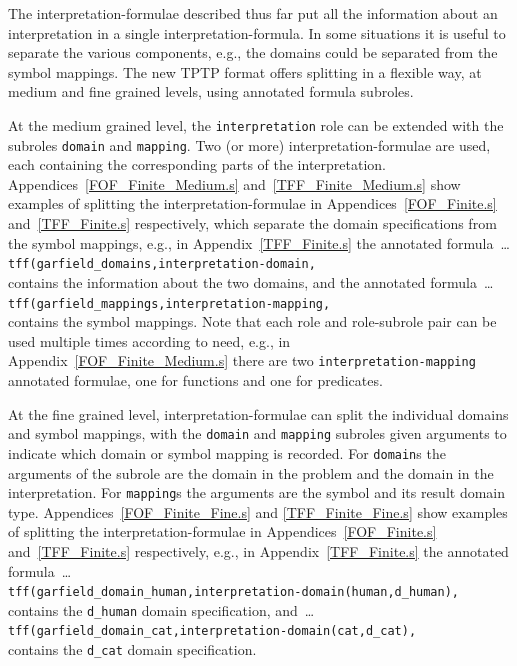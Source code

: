 \documentclass{easychair}
\newcommand{\smalltt}[1]{\small \texttt{#1}}
\begin{document}
The interpretation-formulae described thus far put all the information about an interpretation 
in a single interpretation-formula.
In some situations it is useful to separate the various components, e.g., the domains could be
separated from the symbol mappings.
The new TPTP format offers splitting in a flexible way, at medium and fine grained levels, using 
annotated formula subroles.

At the medium grained level, the {\tt interpretation} role can be extended with the subroles
{\tt domain} and {\tt mapping}.
Two (or more) interpretation-formulae are used, each containing the corresponding parts of the 
interpretation.
Appendices~\ref{FOF_Finite_Medium.s} and~\ref{TFF_Finite_Medium.s} show examples of
splitting the interpretation-formulae in Appendices~\ref{FOF_Finite.s} and~\ref{TFF_Finite.s} 
respectively, which separate the domain specifications from the symbol mappings, e.g., in 
Appendix~\ref{TFF_Finite.s} the annotated formula~\ldots \\
\hspace*{1.0em}\smalltt{tff(garfield\_domains,interpretation-domain,} \\
contains the information about the two domains, and the annotated formula~\ldots \\
\hspace*{1.0em}\smalltt{tff(garfield\_mappings,interpretation-mapping,} \\
contains the symbol mappings.
Note that each role and role-subrole pair can be used multiple times according to need, e.g.,
in Appendix~\ref{FOF_Finite_Medium.s} there are two {\tt interpretation-mapping} annotated
formulae, one for functions and one for predicates.

At the fine grained level, interpretation-formulae can split the individual domains and symbol 
mappings, with the {\tt domain} and {\tt mapping} subroles given arguments to indicate
which domain or symbol mapping is recorded.
For {\tt domain}s the arguments of the subrole are the domain in the problem and the domain in the 
interpretation.
For {\tt mapping}s the arguments are the symbol and its result domain type.
Appendices~\ref{FOF_Finite_Fine.s} and \ref{TFF_Finite_Fine.s} show examples of splitting the 
interpretation-formulae in Appendices~\ref{FOF_Finite.s} and~\ref{TFF_Finite.s} respectively, 
e.g., in Appendix~\ref{TFF_Finite.s} the annotated formula~\ldots \\
\hspace*{1.0em}\smalltt{tff(garfield\_domain\_human,interpretation-domain(human,d\_human),} \\
contains the {\tt d\_human} domain specification, and~\ldots \\
\hspace*{1.0em}\smalltt{tff(garfield\_domain\_cat,interpretation-domain(cat,d\_cat),} \\
contains the {\tt d\_cat} domain specification.
\end{document}
